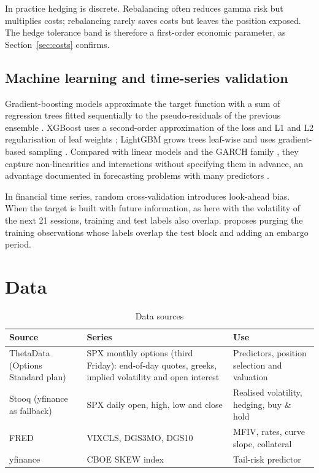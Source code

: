 \documentclass[11pt,a4paper]{article}
\begin{document}
In practice hedging is discrete. Rebalancing often reduces gamma risk but multiplies costs; rebalancing rarely saves costs but leaves the position exposed. The hedge tolerance band is therefore a first-order economic parameter, as Section~\ref{sec:costs} confirms.

\subsection{Machine learning and time-series validation}

Gradient-boosting models approximate the target function with a sum of regression trees fitted sequentially to the pseudo-residuals of the previous ensemble \citep{friedman2001}. XGBoost uses a second-order approximation of the loss and L1 and L2 regularisation of leaf weights \citep{chen2016}; LightGBM grows trees leaf-wise and uses gradient-based sampling \citep{ke2017}. Compared with linear models and the GARCH family \citep{bollerslev1986}, they capture non-linearities and interactions without specifying them in advance, an advantage documented in forecasting problems with many predictors \citep{medeiros2021}.

In financial time series, random cross-validation introduces look-ahead bias. When the target is built with future information, as here with the volatility of the next 21 sessions, training and test labels also overlap. \citet{lopezdeprado2018} proposes purging the training observations whose labels overlap the test block and adding an embargo period.

\section{Data}\label{sec:data}

\begin{table}[!htbp]
\centering
\caption{Data sources}\label{tab:data}
\small
\begin{tabularx}{\linewidth}{@{}>{\raggedright\arraybackslash}p{3.3cm}X>{\raggedright\arraybackslash}p{4.4cm}@{}}
\toprule
Source & Series & Use \\
\midrule
ThetaData (Options Standard plan) & SPX monthly options (third Friday): end-of-day quotes, greeks, implied volatility and open interest & Predictors, position selection and valuation \\
Stooq (yfinance as fallback) & SPX daily open, high, low and close & Realised volatility, hedging, buy \& hold \\
FRED & VIXCLS, DGS3MO, DGS10 & MFIV, rates, curve slope, collateral \\
yfinance & CBOE SKEW index & Tail-risk predictor \\
\bottomrule
\end{tabularx}
\end{table}
\end{document}
